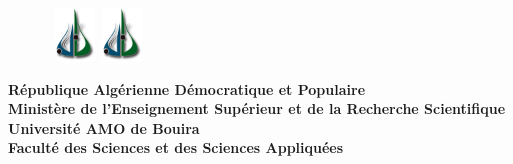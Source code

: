 \begin{titlepage}

\begin{figure}[htbp]
 \hbox{
     \includegraphics[width=40px]{logo.png}
     \hspace*{12.5cm}
     \includegraphics[width=40px]{logo.png}
  }
\end{figure}

\vspace {-1.8cm}

\begin{center}
{\bf R\'{e}publique Alg\'{e}rienne D\'emocratique et Populaire\\
Minist\`{e}re de l'Enseignement Sup\'{e}rieur et de la
Recherche Scientifique} \vspace{0.2cm}\\

{\bf {\large Universit\'{e} AMO de Bouira}}\\

{\bf Facult\'{e} des Sciences et des Sciences Appliquées} \\


\end{center}
\end{titlepage}
